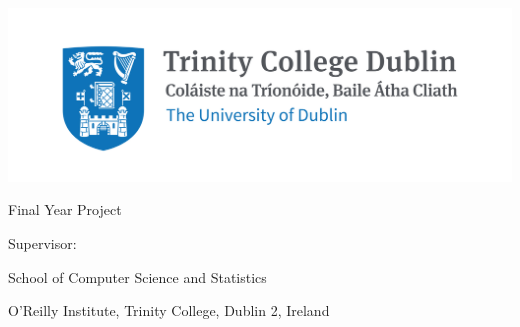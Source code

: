\thispagestyle{empty}

{
  \centering

  \sffamily

  \vspace{45pt}

  \includegraphics{tcd/trinitycollege.jpg}

  \vspace{45pt}
  
  \textbf{\Large \emph \projecttitle}

  \vspace{30pt}

  \authorname

  \degreetitle

  Final Year Project \datenospace

  Supervisor: \supervisorname

  \vspace{130pt}

  \large{
    School of Computer Science and Statistics

    O'Reilly Institute, Trinity College, Dublin 2, Ireland
  }

}

